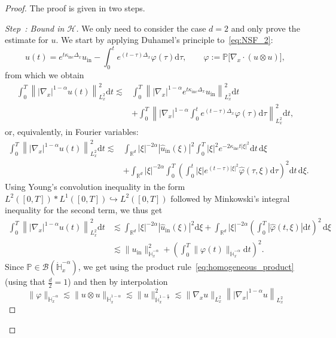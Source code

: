 \documentclass[AHL,Unicode,longabstracts,published]{cedram}
\newcommand{\ini}{\mathrm{in}}
\renewcommand{\d}{\mathrm{d}}
\newcommand{\Inc}{\mathrm{inc}}
\newcommand{\R}{\mathbb{R}}
\newcommand{\bbH}{\mathbb{H}}
\newcommand{\bbP}{\mathbb{P}}
\newcommand{\BBB}{\mathscr{B}}
\newcommand{\HHH}{\mathscr{H}}
\newcommand{\SSSs}{\HHH}
\newcounter{stepcount}
\newenvironment{step}[1]{\refstepcounter{stepcount}\begin{proof}[Step~\thestepcount: #1]}{\let\qed\relax\end{proof}}
\begin{document}
\begin{proof}
The proof is given in two steps.
\setcounter{stepcount}{0}
\begin{step}{{Bound in $\SSSs$}}
We only need to consider the case $d = 2$ and only prove the estimate for $u$. We start by applying Duhamel's principle to~\eqref{eq:NSF_2}:
\[
u(t) = e^{t \kappa_\Inc \Delta_x} u_\ini - \int_0^t e^{(t-\tau) \Delta_x} \varphi(\tau) \d \tau, \qquad \varphi := \bbP \big[\nabla_x \cdot \left(u \otimes u \right) \big],
\]
from which we obtain
\begin{align*}
\int_0^T \left\| |\nabla_x|^{ 1 - \alpha } u(t) \right\|^2_{ L^2_x } \d t \lesssim & \int_0^T \left\| |\nabla_x|^{ 1 - \alpha } e^{ t \kappa_\Inc \Delta_x} u_\ini \right\|_{L^2_x}^2 \d t \\
& + \int_0^T \left\| |\nabla_x|^{ 1 - \alpha } \int_0^t e^{(t-\tau) \Delta_x} \varphi(\tau) \d \tau \right\|_{L^2_x}^2 \d t,
\end{align*}
or, equivalently, in Fourier variables:
\begin{equation*}
\begin{split}
\int_0^T \left\| |\nabla_x|^{ 1 - \alpha } u(t) \right\|^2_{ L^2_x } \d t \lesssim & \int_{\R^{d}} | \xi |^{-2 \alpha} \left| \widehat{u}_\ini(\xi) \right|^2 \int_0^T | \xi |^2 e^{ - 2 \kappa_\Inc t |\xi|^2} \d t \, \d \xi \\
& + \int_{\R^{d}} | \xi|^{ - 2 \alpha } \int_0^T \left(\int_0^t | \xi | e^{(t-\tau) |\xi|^2} \widehat{\varphi}(\tau, \xi) \d \tau \right)^2 \d t \, \d \xi.
\end{split}
\end{equation*}
Using Young's convolution inequality in the form $L^2([0, T]) \ast L^1([0, T]) \hookrightarrow L^2([0, T])$ followed by Minkowski's integral inequality for the second term, we thus get
\begin{align*}
\int_0^T \left\| |\nabla_x|^{ 1 - \alpha } u(t) \right\|^2_{ L^2_x } \d t &\lesssim \int_{\R^{d}} | \xi |^{-2 \alpha} \left| \widehat{u}_\ini(\xi) \right|^2 \d \xi + \int_{\R^{d}} | \xi|^{ - 2 \alpha } \left(\int_0^T \left| \widehat{\varphi}(t, \xi) \right| \d t\right)^2 \, \d \xi \\
&\lesssim \| u_\ini \|^2_{ \dot{\bbH}^{-\alpha}_x } + \left(\int_0^T \| \varphi(t) \|_{ \dot{\bbH}^{-\alpha}_x } \d t\right)^2.
\end{align*}
Since $\bbP \in \BBB\left(\dot{\bbH}_x^{-\alpha} \right)$, we get using the product rule~\eqref{eq:homogeneous_product} (using that $\frac{d}{2} = 1$) and then by interpolation
\[
\| \varphi \|_{ \dot{\bbH}_x^{-\alpha} } \lesssim \| u \otimes u \|_{\dot{\bbH}_x^{1-\alpha}} \lesssim \| u \|_{\dot{\bbH}_x^{1-\frac{\alpha}{2}}}^2 \lesssim \| \nabla_x u \|_{L^2_x} \left\| | \nabla_x |^{1-\alpha} u \right\|_{L^2_x}
\]
\end{step}
\end{proof}
\end{document}
